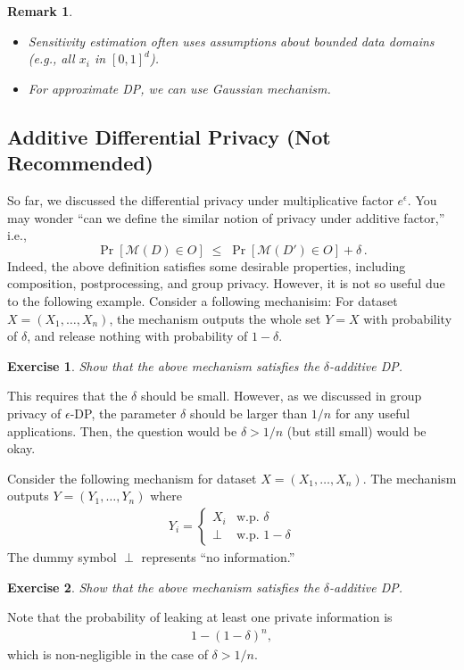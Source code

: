 \documentclass[11pt, a4paper]{article}
\newtheorem{exercise}{Exercise}
\newtheorem{remark}{Remark}
\begin{document}
\begin{remark}
\begin{itemize}
    \item Sensitivity estimation often uses assumptions about bounded data domains (e.g., all $x_i$ in $[0,1]^d$).
    \item For approximate DP, we can use Gaussian mechanism.
\end{itemize}
\end{remark}



\subsection{Additive Differential Privacy (Not Recommended)}
So far, we discussed the differential privacy under multiplicative factor $e^\epsilon$.
You may wonder ``can we define the similar notion of privacy under additive factor,'' i.e., 
\[ 
\Pr[\mathcal{M}(D) \in O] \;\le\; \Pr[\mathcal{M}(D') \in O] + \delta\,.
\] 
Indeed, the above definition satisfies some desirable properties, including composition, postprocessing, and group privacy.
However, it is not so useful due to the following example.
Consider a following mechanisim:
For dataset $X = (X_1, \dots, X_n)$, the mechanism outputs the whole set $Y=X$ with probability of $\delta$,
and release nothing with probability of $1-\delta$.
\begin{exercise}
    Show that the above mechanism satisfies the $\delta$-additive DP.
\end{exercise}
This requires that the $\delta$ should be small.
However, as we discussed in group privacy of $\epsilon$-DP,
the parameter $\delta$ should be larger than $1/n$ for any useful applications.
Then, the question would be $\delta > 1/n$ (but still small) would be okay.

Consider the following mechanism for dataset $X = (X_1, \dots, X_n)$.
The mechanism outputs $Y = (Y_1, \dots, Y_n)$ where
\begin{align}
    Y_i = \begin{cases}
        X_i &\mbox{w.p. $\delta$}\\
        \perp &\mbox{w.p. $1-\delta$}
    \end{cases}
\end{align}
The dummy symbol $\perp$ represents ``no information.''
\begin{exercise}
    Show that the above mechanism satisfies the $\delta$-additive DP.
\end{exercise}
Note that the probability of leaking at least one private information is
\begin{align}
    1- (1-\delta)^n,
\end{align}
which is non-negligible in the case of $\delta > 1/n$.
\end{document}
